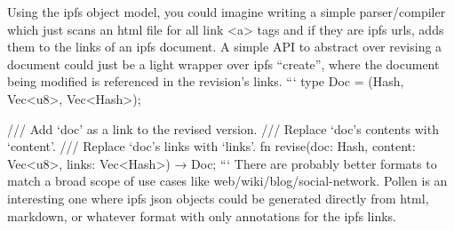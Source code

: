Using the ipfs object model, you could imagine writing a simple parser/compiler which just scans an html file for all link <a> tags and if they are ipfs urls, adds them to the links of an ipfs document. A simple API to abstract over revising a document could just be a light wrapper over ipfs “create”, where the document being modified is referenced in the revision’s links.
```
type Doc = (Hash, Vec<u8>, Vec<Hash>);

/// Add ‘doc’ as a link to the revised version.
/// Replace ‘doc’s contents with ‘content’.
/// Replace ‘doc’s links with ‘links’.
fn revise(doc: Hash, content: Vec<u8>, links: Vec<Hash>) → Doc;
```
There are probably better formats to match a broad scope of use cases like web/wiki/blog/social-network. Pollen is an interesting one where ipfs json objects could be generated directly from html, markdown, or whatever format with only annotations for the ipfs links.
